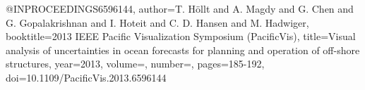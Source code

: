 @INPROCEEDINGS{6596144,
  author={T. {Höllt} and A. {Magdy} and G. {Chen} and G. {Gopalakrishnan} and I. {Hoteit} and C. D. {Hansen} and M. {Hadwiger}},
  booktitle={2013 IEEE Pacific Visualization Symposium (PacificVis)}, 
  title={Visual analysis of uncertainties in ocean forecasts for planning and operation of off-shore structures}, 
  year={2013},
  volume={},
  number={},
  pages={185-192},
  doi={10.1109/PacificVis.2013.6596144}}